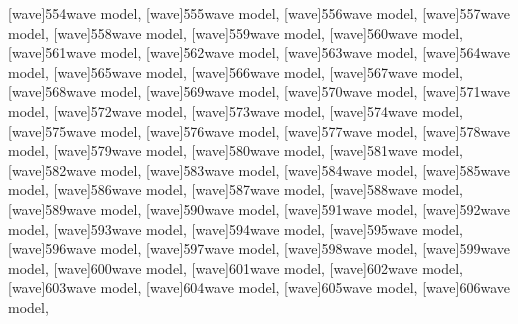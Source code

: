 \documentclass[a4paper,11pt]{article}
\begin{document}
\newpage

\noindent
{}[wave]{554}{wave model},
[wave]{555}{wave model},
[wave]{556}{wave model},
[wave]{557}{wave model},
[wave]{558}{wave model},
[wave]{559}{wave model},
[wave]{560}{wave model}, \\[0.7em]
[wave]{561}{wave model},
[wave]{562}{wave model},
[wave]{563}{wave model},
[wave]{564}{wave model},
[wave]{565}{wave model},
[wave]{566}{wave model},
[wave]{567}{wave model}, \\[0.7em]
[wave]{568}{wave model},
[wave]{569}{wave model},
[wave]{570}{wave model},
[wave]{571}{wave model},
[wave]{572}{wave model},
[wave]{573}{wave model},
[wave]{574}{wave model}, \\[0.7em]
[wave]{575}{wave model},
[wave]{576}{wave model},
[wave]{577}{wave model},
[wave]{578}{wave model},
[wave]{579}{wave model},
[wave]{580}{wave model},
[wave]{581}{wave model}, \\[0.7em]
[wave]{582}{wave model},
[wave]{583}{wave model},
[wave]{584}{wave model},
[wave]{585}{wave model},
[wave]{586}{wave model},
[wave]{587}{wave model},
[wave]{588}{wave model}, \\[0.7em]
[wave]{589}{wave model},
[wave]{590}{wave model},
[wave]{591}{wave model},
[wave]{592}{wave model},
[wave]{593}{wave model},
[wave]{594}{wave model},
[wave]{595}{wave model}, \\[0.7em]
[wave]{596}{wave model},
[wave]{597}{wave model},
[wave]{598}{wave model},
[wave]{599}{wave model},
[wave]{600}{wave model},
[wave]{601}{wave model},
[wave]{602}{wave model}, \\[0.7em]
[wave]{603}{wave model},
[wave]{604}{wave model},
[wave]{605}{wave model},
[wave]{606}{wave model},
\end{document}
